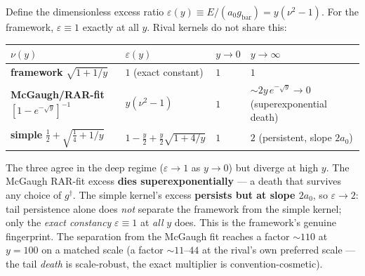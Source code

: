 \documentclass[
]{article}
\newcounter{none} %
\begin{document}
Define the dimensionless excess ratio
\(\varepsilon(y)\equiv E/(a_0 g_\mathrm{bar})=y(\nu^2-1)\). For the
framework, \(\varepsilon\equiv1\) exactly at all \(y\). Rival kernels do
not share this:

{\def\LTcaptype{none} %
\begin{longtable}[]{@{}
  >{\raggedright\arraybackslash}p{}
  >{\raggedright\arraybackslash}p{}
  >{\raggedright\arraybackslash}p{}
  >{\raggedright\arraybackslash}p{}@{}}
\toprule\noalign{}
\begin{minipage}[b]{\linewidth}\raggedright
\(\nu(y)\)
\end{minipage} & \begin{minipage}[b]{\linewidth}\raggedright
\(\varepsilon(y)\)
\end{minipage} & \begin{minipage}[b]{\linewidth}\raggedright
\(y\to0\)
\end{minipage} & \begin{minipage}[b]{\linewidth}\raggedright
\(y\to\infty\)
\end{minipage} \\
\midrule\noalign{}
\endhead
\bottomrule\noalign{}
\endlastfoot
\textbf{framework} \(\sqrt{1+1/y}\) & \(1\) (exact constant) & \(1\) &
\(1\) \\
\textbf{McGaugh/RAR-fit} \(\left[1-e^{-\sqrt y}\right]^{-1}\) &
\(y(\nu^2-1)\) & \(1\) & \(\sim2y\,e^{-\sqrt y}\to0\) (superexponential
death) \\
\textbf{simple} \(\tfrac12+\sqrt{\tfrac14+1/y}\) &
\(1-\tfrac y2+\tfrac y2\sqrt{1+4/y}\) & \(1\) & \(2\) (persistent, slope
\(2a_0\)) \\
\end{longtable}
}

The three agree in the deep regime (\(\varepsilon\to1\) as \(y\to0\))
but diverge at high \(y\). The McGaugh RAR-fit excess \textbf{dies
superexponentially} --- a death that survives any choice of
\(g^\dagger\). The simple kernel's excess \textbf{persists but at slope
\(2a_0\)}, so \(\varepsilon\to2\): tail persistence alone does
\emph{not} separate the framework from the simple kernel; only the
\emph{exact constancy} \(\varepsilon\equiv1\) at \emph{all} \(y\) does.
This is the framework's genuine fingerprint. The separation from the
McGaugh fit reaches a factor \(\sim110\) at \(y=100\) on a matched scale
(a factor \(\sim11\)--\(44\) at the rival's own preferred scale --- the
tail \emph{death} is scale-robust, the exact multiplier is
convention-cosmetic).
\end{document}
